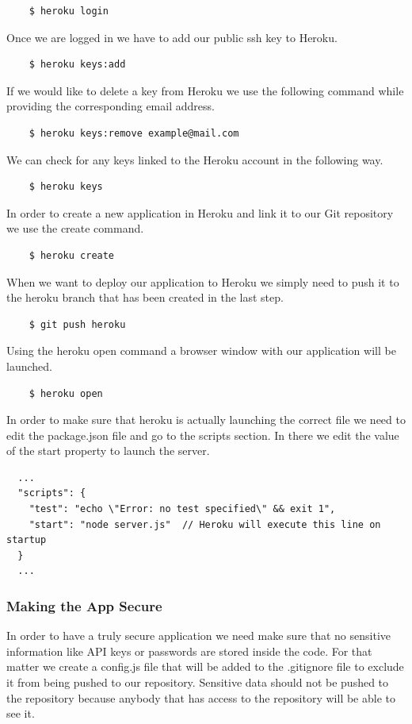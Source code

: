 \begin{verbatim}
	$ heroku login
\end{verbatim}

Once we are logged in we have to add our public ssh key to Heroku.

\begin{verbatim}
	$ heroku keys:add
\end{verbatim}

If we would like to delete a key from Heroku we use the following command while providing the corresponding email address. 
\begin{verbatim}
	$ heroku keys:remove example@mail.com 
\end{verbatim}

We can check for any keys linked to the Heroku account in the following way.
\begin{verbatim}
	$ heroku keys 
\end{verbatim}

In order to create a new application in Heroku and link it to our Git repository we use the create command. 
\begin{verbatim}
	$ heroku create
\end{verbatim}

When we want to deploy our application to Heroku we simply need to push it to the heroku branch that has been created in the last step. 
\begin{verbatim}
	$ git push heroku
\end{verbatim}

Using the heroku open command a browser window with our application will be launched.
\begin{verbatim}
	$ heroku open
\end{verbatim}

In order to make sure that heroku is actually launching the correct file we need to edit the package.json file and go to the scripts section. In there we edit the value of the start property to launch the server. 

\begin{lstlisting}
  ...
  "scripts": {
    "test": "echo \"Error: no test specified\" && exit 1",
    "start": "node server.js"  // Heroku will execute this line on startup  
  } 
  ...
\end{lstlisting} 


\subsubsection{Making the App Secure}
In order to have a truly secure application we need make sure that no sensitive information like API keys or passwords are stored inside the code. For that matter we create a config.js file that will be added to the .gitignore file to exclude it from being pushed to our repository. Sensitive data should not be pushed to the repository because anybody that has access to the repository will be able to see it.   
 
